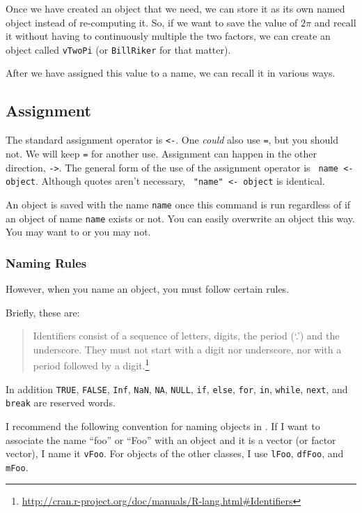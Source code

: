 Once we have created an object that we need, we can store it as its
own named object instead of re-computing it. So, if we want to save
the value of $2 \pi$ and recall it without having to continuously
multiple the two factors, we can create an object called
\texttt{vTwoPi} (or \texttt{BillRiker} for that matter).

After we have assigned this value to a name, we can recall it in
various ways.

\subsection{Assignment}

The standard assignment operator is \texttt{<-}. One \textit{could}
also use \texttt{=}, but you should not. We will keep \texttt{=} for
another use. Assignment can happen in the other direction,
\texttt{->}. The general form of the use of the assignment operator is
\verb= name <- object=. Although quotes aren't necessary,
\verb= "name" <- object= is identical.

An object is saved with the name \texttt{name} once this command is
run regardless of if an object of name \texttt{name} exists or
not. You can easily overwrite an object this way. You may want to or
you may not.

\subsubsection{Naming Rules}

However, when you name an object, you must follow certain rules.

Briefly, these are:

\begin{quote}
  Identifiers consist of a sequence of letters, digits, the period
  (`.') and the underscore. They must not start with a digit nor
  underscore, nor with a period followed by a
  digit.\footnote{\url{http://cran.r-project.org/doc/manuals/R-lang.html\#Identifiers}}
\end{quote}

In addition \texttt{TRUE}, \texttt{FALSE}, \texttt{Inf}, \texttt{NaN},
\texttt{NA}, \texttt{NULL}, \texttt{if}, \texttt{else}, \texttt{for},
\texttt{in}, \texttt{while}, \texttt{next}, and \texttt{break} are
reserved words.

I recommend the following convention for naming objects in \R{}. If I
want to associate the name ``foo'' or ``Foo'' with an object and it is
a vector (or factor vector), I name it \texttt{vFoo}. For objects of
the other classes, I use \texttt{lFoo}, \texttt{dfFoo}, and
\texttt{mFoo}.

